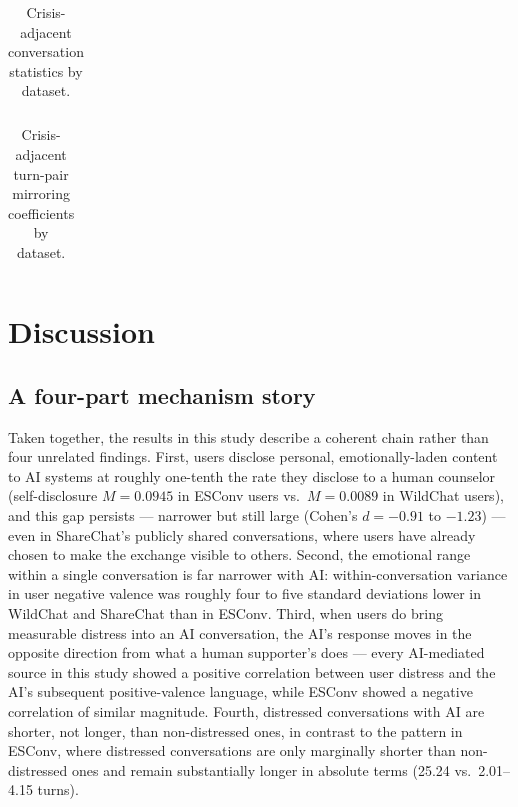 \documentclass[11pt]{article}
\begin{document}
\begin{table}[htbp]
\centering
\caption{Crisis-adjacent conversation statistics by dataset.}
\label{tab:10}
\begin{tabular}{l}
\toprule
\bottomrule
\end{tabular}
\end{table}

\begin{table}[htbp]
\centering
\caption{Crisis-adjacent turn-pair mirroring coefficients by dataset.}
\label{tab:11}
\begin{tabular}{l}
\toprule
\bottomrule
\end{tabular}
\end{table}

\section{Discussion}

\subsection{A four-part mechanism story}

Taken together, the results in this study describe a coherent chain rather than four unrelated findings. First, users disclose personal, emotionally-laden content to AI systems at roughly one-tenth the rate they disclose to a human counselor (self-disclosure $M = 0.0945$ in ESConv users vs.\ $M = 0.0089$ in WildChat users), and this gap persists --- narrower but still large (Cohen's $d = -0.91$ to $-1.23$) --- even in ShareChat's publicly shared conversations, where users have already chosen to make the exchange visible to others. Second, the emotional range within a single conversation is far narrower with AI: within-conversation variance in user negative valence was roughly four to five standard deviations lower in WildChat and ShareChat than in ESConv. Third, when users do bring measurable distress into an AI conversation, the AI's response moves in the opposite direction from what a human supporter's does --- every AI-mediated source in this study showed a positive correlation between user distress and the AI's subsequent positive-valence language, while ESConv showed a negative correlation of similar magnitude. Fourth, distressed conversations with AI are shorter, not longer, than non-distressed ones, in contrast to the pattern in ESConv, where distressed conversations are only marginally shorter than non-distressed ones and remain substantially longer in absolute terms (25.24 vs.\ 2.01--4.15 turns).
\end{document}
